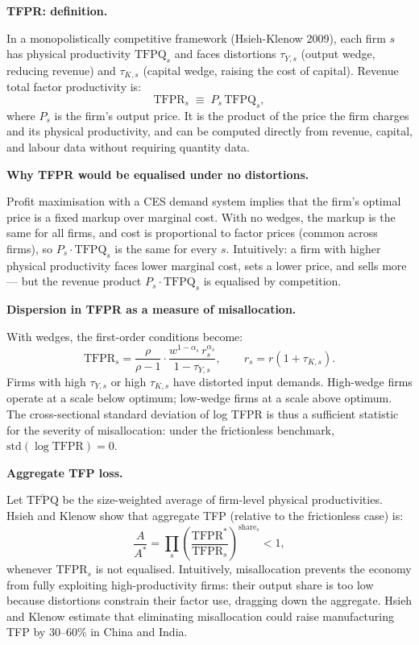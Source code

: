 \documentclass[a4paper,11pt]{article}
\begin{document}
\begin{answerbox}
\textbf{TFPR: definition.}

In a monopolistically competitive framework (Hsieh-Klenow 2009), each firm $s$ has physical productivity $\mathrm{TFPQ}_s$ and faces distortions $\tau_{Y,s}$ (output wedge, reducing revenue) and $\tau_{K,s}$ (capital wedge, raising the cost of capital).  Revenue total factor productivity is:
\[
    \mathrm{TFPR}_s \;\equiv\; P_s\,\mathrm{TFPQ}_s,
\]
where $P_s$ is the firm's output price.  It is the product of the price the firm charges and its physical productivity, and can be computed directly from revenue, capital, and labour data without requiring quantity data.

\textbf{Why TFPR would be equalised under no distortions.}

Profit maximisation with a CES demand system implies that the firm's optimal price is a fixed markup over marginal cost.  With no wedges, the markup is the same for all firms, and cost is proportional to factor prices (common across firms), so $P_s \cdot \mathrm{TFPQ}_s$ is the same for every $s$.  Intuitively: a firm with higher physical productivity faces lower marginal cost, sets a lower price, and sells more --- but the revenue product $P_s \cdot \mathrm{TFPQ}_s$ is equalised by competition.

\textbf{Dispersion in TFPR as a measure of misallocation.}

With wedges, the first-order conditions become:
\[
    \mathrm{TFPR}_s = \frac{\rho}{\rho-1}\cdot\frac{w^{1-\alpha_s}\,r_s^{\alpha_s}}{1 - \tau_{Y,s}},
    \qquad r_s = r(1+\tau_{K,s}).
\]
Firms with high $\tau_{Y,s}$ or high $\tau_{K,s}$ have distorted input demands.  High-wedge firms operate at a scale below optimum; low-wedge firms at a scale above optimum.  The cross-sectional standard deviation of log TFPR is thus a sufficient statistic for the severity of misallocation: under the frictionless benchmark, $\mathrm{std}(\log \mathrm{TFPR}) = 0$.

\textbf{Aggregate TFP loss.}

Let $\overline{\mathrm{TFPQ}}$ be the size-weighted average of firm-level physical productivities.  Hsieh and Klenow show that aggregate TFP (relative to the frictionless case) is:
\[
    \frac{A}{A^*} = \prod_s \left(\frac{\mathrm{TFPR}^*}{\mathrm{TFPR}_s}\right)^{\text{share}_s} < 1,
\]
whenever $\mathrm{TFPR}_s$ is not equalised.  Intuitively, misallocation prevents the economy from fully exploiting high-productivity firms: their output share is too low because distortions constrain their factor use, dragging down the aggregate.  Hsieh and Klenow estimate that eliminating misallocation could raise manufacturing TFP by 30--60\% in China and India.
\end{answerbox}
\end{document}
